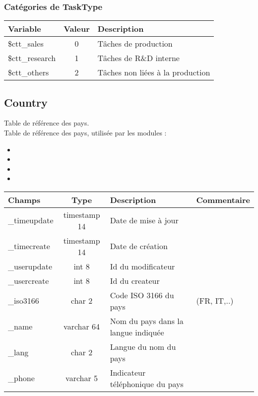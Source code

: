 \subsubsection{Catégories de TaskType}

\begin{tabular}{|p{3cm}|c|p{5.4cm}|}
\hline
\textbf{Variable} & \textbf{Valeur} & \textbf{Description} \\
\hline
\$ctt\_sales & 0 & Tâches de production \\
\hline
\$ctt\_research & 1 & Tâches de R\&D interne \\
\hline
\$ctt\_others & 2 & Tâches non liées à la production \\
\hline
\end{tabular}


\subsection{Country}
Table de référence des pays.\\

Table de référence des pays, utilisée par les modules :
\begin{itemize}
 \item \company
 \item \contact
 \item \List
 \item 
\end{itemize}
\vspace{0.4cm}

\begin{tabular}{|p{3cm}|c|p{5.4cm}|p{2.6cm}|}
\hline
\textbf{Champs} & \textbf{Type} & \textbf{Description} & \textbf{Commentaire} \\
\hline
\_timeupdate & timestamp 14 & Date de mise à jour & \\
\hline
\_timecreate & timestamp 14 & Date de création & \\
\hline
\_userupdate & int 8 & Id du modificateur & \\
\hline
\_usercreate & int 8 & Id du createur & \\
\hline
\_iso3166 & char 2 & Code ISO 3166 du pays & (FR, IT,..) \\
\hline
\_name & varchar 64 & Nom du pays dans la langue indiquée & \\
\hline
\_lang & char 2 & Langue du nom du pays & \\
\hline
\_phone & varchar 5 & Indicateur téléphonique du pays & \\
\hline
\end{tabular}

